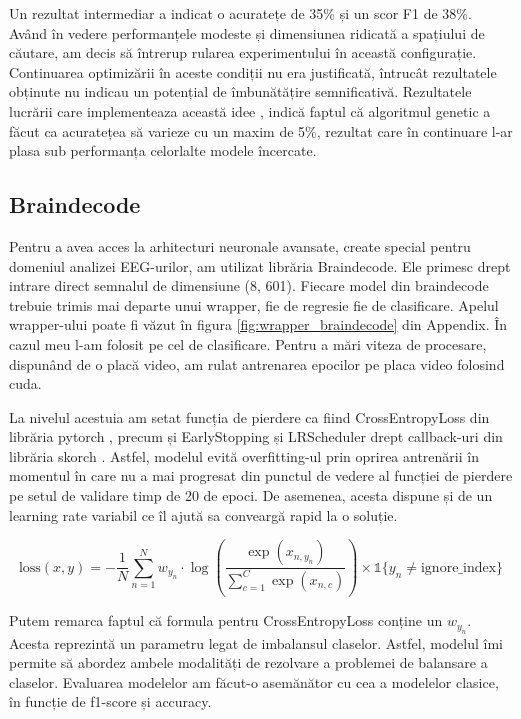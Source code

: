 Un rezultat intermediar a indicat o acuratețe de 35\% și un scor F1 de 38\%. Având în vedere performanțele modeste și dimensiunea ridicată a spațiului de căutare, am decis să întrerup rularea experimentului în această configurație. Continuarea optimizării în aceste condiții nu era justificată, întrucât rezultatele obținute nu indicau un potențial de îmbunătățire semnificativă. Rezultatele lucrării care implementeaza această idee \cite{ATKINSON201635}, indică faptul că algoritmul genetic a făcut ca acuratețea să varieze cu un maxim de 5\%, rezultat care în continuare l-ar plasa sub performanța celorlalte modele încercate. 

\subsection{Braindecode}
Pentru a avea acces la arhitecturi neuronale avansate, create special pentru domeniul analizei EEG-urilor, am utilizat librăria Braindecode\cite{braindecode}. Ele primesc drept intrare direct semnalul de dimensiune (8, 601). Fiecare model din braindecode trebuie trimis mai departe unui wrapper, fie de regresie fie de clasificare. Apelul wrapper-ului poate fi văzut în figura \ref{fig:wrapper_braindecode} din Appendix. În cazul meu l-am folosit pe cel de clasificare. Pentru a mări viteza de procesare, dispunând de o placă video, am rulat antrenarea epocilor pe placa video folosind cuda.

La nivelul acestuia am setat funcția de pierdere ca fiind CrossEntropyLoss din librăria pytorch \cite{pytorch}, precum și EarlyStopping și LRScheduler drept callback-uri din librăria skorch \cite{skorch}. Astfel, modelul evită overfitting-ul prin oprirea antrenării în momentul în care nu a mai progresat din punctul de vedere al funcției de pierdere pe setul de validare timp de 20 de epoci. De asemenea, acesta dispune și de un learning rate variabil ce îl ajută sa conveargă rapid la o soluție. 

\begin{equation}
    \text{loss}(x, y) = -\frac{1}{N} \sum_{n=1}^{N} w_{y_n} \cdot \log\left(\frac{\exp(x_{n,y_n})}{\sum_{c=1}^{C} \exp(x_{n,c})}\right) \times \mathbb{1}\{y_n \neq \text{ignore\_index}\}
\end{equation}

Putem remarca faptul că formula pentru CrossEntropyLoss conține un \(w_{y_n}\). Acesta reprezintă un parametru legat de imbalansul claselor. Astfel, modelul îmi permite să abordez ambele modalități de rezolvare a problemei de balansare a claselor. Evaluarea modelelor am făcut-o asemănător cu cea a modelelor clasice, în funcție de f1-score și accuracy.

